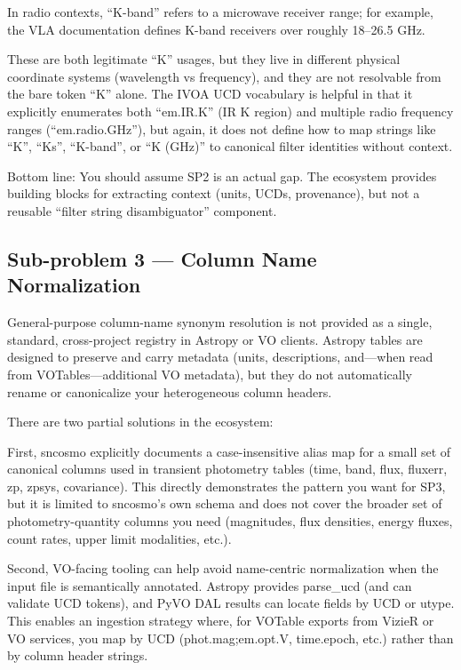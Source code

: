 \documentclass[twocolumn]{aastex701}
\begin{document}
In radio contexts, “K-band” refers to a microwave receiver range; for example, the VLA documentation defines K-band receivers over roughly 18–26.5 GHz. \citep{ref22}

These are both legitimate “K” usages, but they live in different physical coordinate systems (wavelength vs frequency), and they are not resolvable from the bare token “K” alone. The IVOA UCD vocabulary is helpful in that it explicitly enumerates both “em.IR.K” (IR K region) and multiple radio frequency ranges (“em.radio.GHz”), but again, it does not define how to map strings like “K”, “Ks”, “K-band”, or “K (GHz)” to canonical filter identities without context. \citep{ref23}

Bottom line: You should assume SP2 is an actual gap. The ecosystem provides building blocks for extracting context (units, UCDs, provenance), but not a reusable “filter string disambiguator” component.

\subsection{Sub-problem 3 — Column Name Normalization}

General-purpose column-name synonym resolution is not provided as a single, standard, cross-project registry in Astropy or VO clients. Astropy tables are designed to preserve and carry metadata (units, descriptions, and—when read from VOTables—additional VO metadata), but they do not automatically rename or canonicalize your heterogeneous column headers. \citep{ref24}

There are two partial solutions in the ecosystem:

First, sncosmo explicitly documents a case-insensitive alias map for a small set of canonical columns used in transient photometry tables (time, band, flux, fluxerr, zp, zpsys, covariance). This directly demonstrates the pattern you want for SP3, but it is limited to sncosmo’s own schema and does not cover the broader set of photometry-quantity columns you need (magnitudes, flux densities, energy fluxes, count rates, upper limit modalities, etc.). \citep{ref25}

Second, VO-facing tooling can help avoid name-centric normalization when the input file is semantically annotated. Astropy provides parse\_ucd (and can validate UCD tokens), and PyVO DAL results can locate fields by UCD or utype. This enables an ingestion strategy where, for VOTable exports from VizieR or VO services, you map by UCD (phot.mag;em.opt.V, time.epoch, etc.) rather than by column header strings. \citep{ref26}
\end{document}
